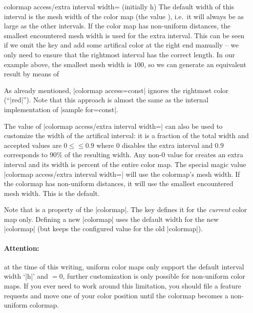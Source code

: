 {\begin{pgfplotskey}{colormap access/extra interval width= (initially h)}
	The default width of this interval is the mesh width of the color map (the value ), i.e.\ it will always be as large as the other intervals. If the color map has non-uniform distances, the smallest encountered mesh width is used for the extra interval. This can be seen if we omit the key and add some artifical color at the right end manually -- we only need to ensure that the rightmost interval has the correct length. In our example above, the smallest mesh width is $100$, so we can generate an equivalent result by means of
\begin{codeexample}[]
\pgfplotscolorbardrawstandalone[
    colormap={nonuniform}{
        of colormap={
            viridis,
            target pos={0,200,300,500,700,1000}
        }
		color(1100)=(red)
    },
    colorbar horizontal,
    colormap access=const,
    colorbar style={xtick=data,font=\tiny,
        /pgf/number format/precision=0},
    colormap access=const]
\end{codeexample}
	\noindent As already mentioned, |colormap access=const| ignores the rightmost color (``|red|''). Note that this approach is almost the same as the internal implementation of |sample for=const|.

	The value of |colormap access/extra interval width=| can also be used to customize the width of the artifical interval: it is a fraction of the total width and accepted values are $0\le $$\le 0.9$ where $0$ disables the extra interval and $0.9$ corresponds to $90\%$ of the resulting width. 
	Any non-$0$ value for  creates an extra interval and its width is  percent of the entire color map.
	The special magic value |colormap access/extra interval width=| will use the colormap's mesh width. If the colormap has non-uniform distances, it will use the smallest encountered mesh width. This is the default.

	Note that  is a property of the |colormap|. The key defines it for the \emph{current} color map only. Defining a new |colormap| uses the default width for the new |colormap| (but keeps the configured value for the old |colormap|).

	\paragraph{Attention:} at the time of this writing, uniform color maps only support the default interval width `|h|' and $=0$, further customization is only possible for non-uniform color maps. If you ever need to work around this limitation, you should file a feature requests and move one of your color position until the colormap becomes a non-uniform colormap.
	
\end{pgfplotskey}

}%

